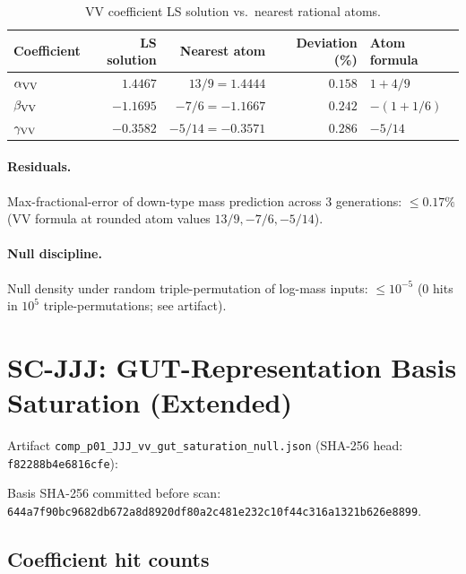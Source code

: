 \documentclass[11pt]{article}
\theoremstyle{remark}
\begin{document}
\begin{table}[ht]
\centering
\caption{VV coefficient LS solution vs.\ nearest rational atoms.}
\label{tab:si_vv}
\begin{tabular}{lrrrl}
\toprule
Coefficient & LS solution & Nearest atom & Deviation (\%) & Atom formula \\
\midrule
$\alpha_{\rm VV}$ & $1.4467$ & $13/9=1.4444$ & $0.158$ & $1+4/9$ \\
$\beta_{\rm VV}$ & $-1.1695$ & $-7/6=-1.1667$ & $0.242$ & $-(1+1/6)$ \\
$\gamma_{\rm VV}$ & $-0.3582$ & $-5/14=-0.3571$ & $0.286$ & $-5/14$ \\
\bottomrule
\end{tabular}
\end{table}

\paragraph{Residuals.}
Max-fractional-error of down-type mass prediction across 3 generations:
$\leq 0.17\%$ (VV formula at rounded atom values $13/9, -7/6, -5/14$).

\paragraph{Null discipline.}
Null density under random triple-permutation of log-mass inputs: $\leq10^{-5}$
(0 hits in $10^5$ triple-permutations; see artifact).

\section{SC-JJJ: GUT-Representation Basis Saturation (Extended)}
\label{sec:si_jjj}

Artifact \texttt{comp\_p01\_JJJ\_vv\_gut\_saturation\_null.json}
(SHA-256 head: \texttt{f82288b4e6816cfe}):

{\sloppy Basis SHA-256 committed before scan:
\texttt{644a7f90bc9682db672a8d89}\allowbreak\texttt{20df80a2c481e232c10f44c3}\allowbreak\texttt{16a1321b626e8899}.\par}

\subsection{Coefficient hit counts}
\end{document}
